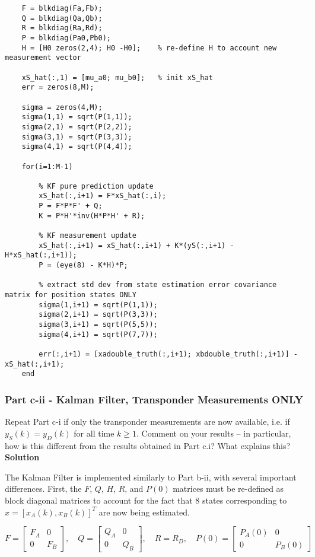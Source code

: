 \documentclass[]{article}
\begin{document}
\begin{lstlisting}
	F = blkdiag(Fa,Fb);
	Q = blkdiag(Qa,Qb);
	R = blkdiag(Ra,Rd);
	P = blkdiag(Pa0,Pb0);
	H = [H0 zeros(2,4); H0 -H0];	% re-define H to account new measurement vector
	
	xS_hat(:,1) = [mu_a0; mu_b0];   % init xS_hat
	err = zeros(8,M);
	
	sigma = zeros(4,M);
	sigma(1,1) = sqrt(P(1,1));
	sigma(2,1) = sqrt(P(2,2));
	sigma(3,1) = sqrt(P(3,3));
	sigma(4,1) = sqrt(P(4,4));
	
	for(i=1:M-1)
	
		% KF pure prediction update
		xS_hat(:,i+1) = F*xS_hat(:,i);
		P = F*P*F' + Q;
		K = P*H'*inv(H*P*H' + R);
	
		% KF measurement update
		xS_hat(:,i+1) = xS_hat(:,i+1) + K*(yS(:,i+1) - H*xS_hat(:,i+1));
		P = (eye(8) - K*H)*P;
	
		% extract std dev from state estimation error covariance matrix for position states ONLY
		sigma(1,i+1) = sqrt(P(1,1));
		sigma(2,i+1) = sqrt(P(3,3));
		sigma(3,i+1) = sqrt(P(5,5));
		sigma(4,i+1) = sqrt(P(7,7));
	
		err(:,i+1) = [xadouble_truth(:,i+1); xbdouble_truth(:,i+1)] - xS_hat(:,i+1);
	end
\end{lstlisting}

\subsubsection*{Part c-ii - Kalman Filter, Transponder Measurements ONLY}

Repeat Part c-i if only the transponder measurements are now available, i.e. if $y_S(k) = y_D(k)$ for all time $k\geq1$. Comment on your results – in particular, how is this different from the results obtained in Part c.i? What explains this?\\

\noindent\textbf{Solution}

\noindent The Kalman Filter is implemented similarly to Part b-ii, with several important differences. First, the $F$, $Q$, $H$, $R$, and $P(0)$ matrices must be re-defined as block diagonal matrices to account for the fact that 8 states corresponding to $\hat{x}=[x_A(k),x_B(k)]^T$ are now being estimated. 

\begin{equation}
F = \left[\begin{array}{cc}F_A & 0\\ 0 & F_B\end{array}\right],\quad
Q = \left[\begin{array}{cc}Q_A & 0\\ 0 & Q_B\end{array}\right],\quad
R = R_D,\quad
P(0) = \left[\begin{array}{cc}P_A(0) & 0\\ 0 & P_B(0)\end{array}\right]
\label{eq:KF_cii_1}
\end{equation}
\end{document}
